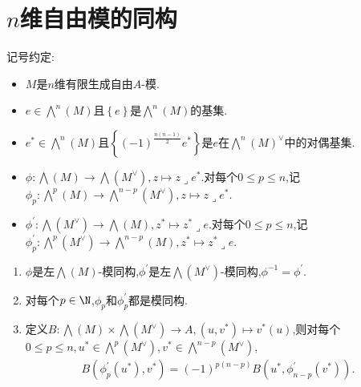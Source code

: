 \section{\texorpdfstring{$n$}{n}维自由模的同构}

记号约定:
\begin{itemize}
	\item $M$是$n$维有限生成自由$A$-模.
	\item $e\in\bigwedge\limits^{n}\left(M\right)$且$\left\{e\right\}$是$\bigwedge\limits^{n}\left(M\right)$的基集.
	\item $e^{\ast}\in\bigwedge\limits^{n}\left(M\right)$且$\left\{\left(-1\right)^{\frac{n\left(n-1\right)}{2}}e^{\ast}\right\}$是$e$在$\bigwedge\limits^{n}\left(M\right)^{\vee}$中的对偶基集.
	\item $\phi:\bigwedge\left(M\right)\to\bigwedge\left(M^{\vee}\right),z\mapsto z\lrcorner e^{\ast}$.对每个$0\leq p\leq n$,记$\phi_{p}:\bigwedge\limits^{p}\left(M\right)\to\bigwedge\limits^{n-p}\left(M^{\vee}\right),z\mapsto z\lrcorner e^{\ast}$.
	\item $\phi^{\prime}:\bigwedge\left(M^{\vee}\right)\to\bigwedge\left(M\right),z^{\ast}\mapsto z^{\ast}\lrcorner e$.对每个$0\leq p\leq n$,记$\phi_{p}^{\prime}:\bigwedge\limits^{p}\left(M^{\vee}\right)\to\bigwedge\limits^{n-p}\left(M\right),z^{\ast}\mapsto z^{\ast}\lrcorner e$.
\end{itemize}


\begin{proposition}{}{}
	\begin{enumerate}
		\item $\phi$是左$\bigwedge\left(M\right)$-模同构,$\phi^{\prime}$是左$\bigwedge\left(M^{\vee}\right)$-模同构,$\phi^{-1}=\phi^{\prime}$.
		\item 对每个$p\in\N$,$\phi_{p}$和$\phi_{p}^{\prime}$都是模同构.
		\item 定义$B:\bigwedge\left(M\right)\times\bigwedge\left(M^{\vee}\right)\to A,\left(u,v^{\ast}\right)\mapsto v^{\ast}\left(u\right)$,则对每个$0\leq p\leq n,u^{\ast}\in\bigwedge\limits^{p}\left(M^{\vee}\right),v^{\ast}\in\bigwedge\limits^{n-p}\left(M^{\vee}\right)$,
		\begin{align*}
			B\left(\phi_{p}^{\prime}\left(u^{\ast}\right),v^{\ast}\right)=\left(-1\right)^{p\left(n-p\right)}B\left(u^{\ast},\phi_{n-p}^{\prime}\left(v^{\ast}\right)\right).
		\end{align*}
	\end{enumerate}
\end{proposition}

